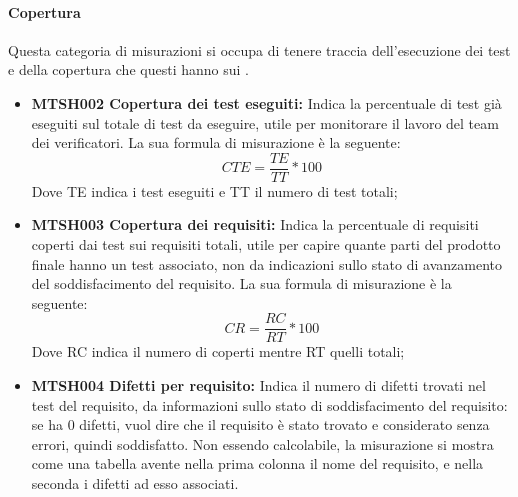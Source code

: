 \documentclass[NormeDiProgetto.tex]{subfiles}
\begin{document}
	\paragraph{Copertura}
	Questa categoria di misurazioni si occupa di tenere traccia dell'esecuzione dei test e della copertura che questi hanno sui .
	\begin{itemize}
		\item \textbf{MTSH002 Copertura dei test eseguiti:} Indica la percentuale di test già eseguiti sul totale di test da eseguire, utile per monitorare il lavoro del team dei verificatori. La sua formula di misurazione è la seguente:
		\[CTE=\dfrac{TE}{TT}*100\]
		Dove TE indica i test eseguiti e TT il numero di test totali;
		\item \textbf{MTSH003 Copertura dei requisiti:} Indica la percentuale di requisiti coperti dai test sui requisiti totali, utile per capire quante parti del prodotto finale hanno un test associato, non da indicazioni sullo stato di avanzamento del soddisfacimento del requisito. La sua formula di misurazione è la seguente:
		\[CR=\dfrac{RC}{RT}*100\]
		Dove RC indica il numero di  coperti mentre RT quelli totali;
		\item \textbf{MTSH004 Difetti per requisito:} Indica il numero di difetti trovati nel test del requisito, da informazioni sullo stato di soddisfacimento del requisito: se ha 0 difetti, vuol dire che il requisito è stato trovato e considerato senza errori, quindi soddisfatto.
		Non essendo calcolabile, la misurazione si mostra come una tabella avente nella prima colonna il nome del requisito, e nella seconda i difetti ad esso associati.
	\end{itemize}

	
\end{document}
